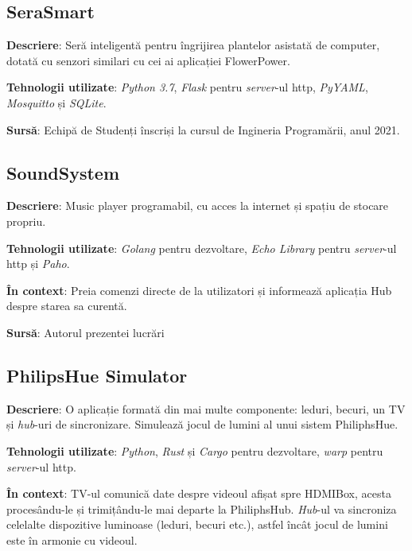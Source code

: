 \subsection*{SeraSmart}

\textbf{Descriere}: Seră inteligentă pentru îngrijirea plantelor asistată de computer, dotată cu senzori similari cu cei ai aplicației FlowerPower.

\textbf{Tehnologii utilizate}: \textit{Python 3.7}, \textit{Flask} pentru \textit{server}-ul \acrshort{http}, \textit{PyYAML}, \textit{Mosquitto} și \textit{SQLite}.

\textbf{Sursă}: Echipă de Studenți înscriși la cursul de Ingineria Programării, anul 2021.

\subsection*{SoundSystem}

\textbf{Descriere}: Music player programabil, cu acces la internet și spațiu de stocare propriu.

\textbf{Tehnologii utilizate}: \textit{Golang} pentru dezvoltare, \textit{Echo Library} pentru \textit{server}-ul \acrshort{http} și \textit{Paho}.

\textbf{În context}: Preia comenzi directe de la utilizatori și informează aplicația Hub despre starea sa curentă.

\textbf{Sursă}: Autorul prezentei lucrări

\subsection*{PhilipsHue Simulator}

\textbf{Descriere}: O aplicație formată din mai multe componente: leduri, becuri, un TV și \textit{hub}-uri de sincronizare. Simulează jocul de lumini al unui sistem PhiliphsHue.

\textbf{Tehnologii utilizate}: \textit{Python}, \textit{Rust} și \textit{Cargo} pentru dezvoltare, \textit{warp} pentru \textit{server}-ul \acrshort{http}.

\textbf{În context}: TV-ul comunică date despre videoul afișat spre HDMIBox, acesta procesându-le și trimițându-le mai departe la PhiliphsHub. \textit{Hub}-ul va sincroniza celelalte dispozitive luminoase (leduri, becuri etc.), astfel încât jocul de lumini este în armonie cu videoul.

